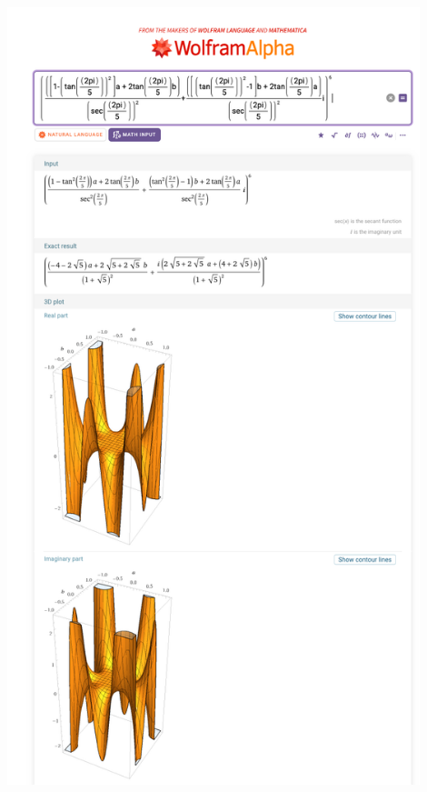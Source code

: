 \documentclass{article}
\begin{document}
\begin{minipage}{0.6\textwidth}
    \centering
    \includegraphics[width=0.9\textwidth]{(R(z))^6.png}
    \caption{$(R(z))^6$}
\end{minipage}
\end{document}
